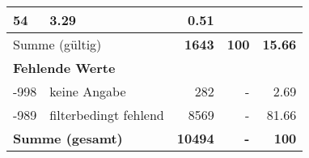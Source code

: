 \begin{longtable}{lXrrr}
       \num{54} &
       \num[round-mode=places,round-precision=2]{3,29} &
         \num[round-mode=places,round-precision=2]{0,51} \\
     \midrule
     \multicolumn{2}{l}{Summe (gültig)} &
       \textbf{\num{1643}} &
     \textbf{100} &
       \textbf{\num[round-mode=places,round-precision=2]{15,66}} \\
     \multicolumn{5}{l}{\textbf{Fehlende Werte}}\\
       -998 &
       keine Angabe &
         \num{282} &
        - &
         \num[round-mode=places,round-precision=2]{2,69} \\
       -989 &
       filterbedingt fehlend &
         \num{8569} &
        - &
         \num[round-mode=places,round-precision=2]{81,66} \\
     \midrule
     \multicolumn{2}{l}{\textbf{Summe (gesamt)}} &
          \textbf{\num{10494}} &
        \textbf{-} &
        \textbf{100} \\
     \bottomrule
     \end{longtable}
     
